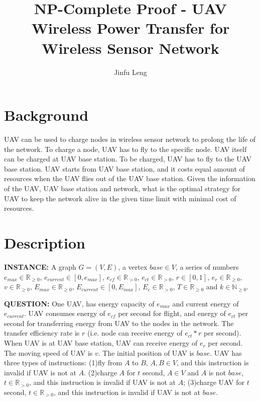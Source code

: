 \usepackage{amsfonts}


\title{NP-Complete Proof - UAV Wireless Power Transfer for Wireless Sensor Network}
\author{Jinfu Leng}
\maketitle
\section{Background}
UAV can be used to charge nodes in wireless sensor network to prolong the life of the network. To charge a node, UAV has to fly to the specific node. UAV itself can be charged at UAV base station. To be charged, UAV has to fly to the UAV base station. UAV starts from UAV base station, and it costs equal amount of resources when the UAV flies out of the UAV base station. Given the information of the UAV, UAV base station and network, what is the optimal strategy for UAV to keep the network alive in the given time limit with minimal cost of resources.

\section{Description}
\noindent
\textbf{INSTANCE:} 
A graph $G = (V, E)$, a vertex $base \in V$, a series of numbers $e_{max} \in \mathbb{R}_{\geq0}$, $e_{current} \in [0, e_{max}]$, $e_{cf} \in \mathbb{R}_{>0}$, $e_{ct} \in \mathbb{R}_{>0}$, $r \in [0, 1]$, $e_r \in \mathbb{R}_{\geq0}$, $v \in \mathbb{R}_{\geq0}$, $E_{max} \in \mathbb{R}_{\geq0}$, $E_{current} \in [0, E_{max}]$, $E_{c} \in \mathbb{R}_{>0}$, $T \in \mathbb{R}_{\geq0}$ and $k \in \mathbb{N}_{\geq0}$.

\noindent
\textbf{QUESTION:} 
One UAV, has energy capacity of $e_{max}$ and current energy of $e_{current}$. UAV consumes energy of $e_{cf}$ per second for flight, and energy of $e_{ct}$ per second for transferring energy from UAV to the nodes in the network. The transfer efficiency rate is $r$ (i.e. node can receive energy of $e_{ct}*r$ per second). When UAV is at UAV base station, UAV can receive energy of $e_r$ per second. The moving speed of UAV is $v$. The initial position of UAV is $base$. UAV has three types of instructions: (1)fly from $A$ to $B$, $A,B \in V$, and this instruction is invalid if UAV is not at $A$. (2)charge $A$ for $t$ second, $A \in V$ and $A$ is not $base$, $t \in \mathbb{R}_{>0}$, and this instruction is invalid if UAV is not at $A$; (3)charge UAV for $t$ second, $t \in \mathbb{R}_{>0}$, and this instruction is invalid if UAV is not at $base$.

